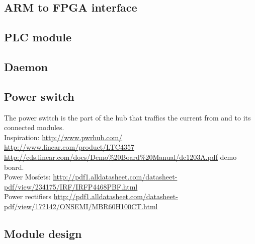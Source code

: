 \subsection{ARM to FPGA interface}



\subsection{PLC module}



\subsection{Daemon}



\subsection{Power switch}
The power switch is the part of the hub that traffics the current from and to its connected modules. 
\\ Inspiration: 
\url{http://www.pwrhub.com/}
\\ \url{http://www.linear.com/product/LTC4357}
\\ \url{http://cds.linear.com/docs/Demo\%20Board\%20Manual/dc1203A.pdf} demo board.
\\ Power Mosfets:
\url{http://pdf1.alldatasheet.com/datasheet-pdf/view/234175/IRF/IRFP4468PBF.html}
\\ Power rectifiers
\url{http://pdf1.alldatasheet.com/datasheet-pdf/view/172142/ONSEMI/MBR60H100CT.html}


\subsection{Module design}



